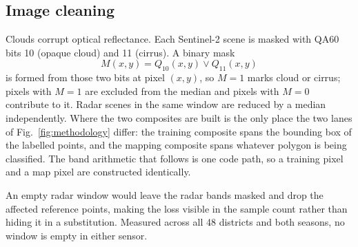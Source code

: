 \documentclass[conference]{IEEEtran}
\begin{document}
\subsection{Image cleaning}
Clouds corrupt optical reflectance. Each Sentinel-2 scene is masked with QA60 bits 10 (opaque cloud) and 11 (cirrus). A binary mask
\begin{equation}
M(x,y) = Q_{10}(x,y) \lor Q_{11}(x,y)
\end{equation}
is formed from those two bits at pixel $(x, y)$, so $M=1$ marks cloud or cirrus; pixels with $M=1$ are excluded from the median and pixels with $M=0$ contribute to it. Radar scenes in the same window are reduced by a median independently. Where the two composites are built is the only place the two lanes of Fig.~\ref{fig:methodology} differ: the training composite spans the bounding box of the labelled points, and the mapping composite spans whatever polygon is being classified. The band arithmetic that follows is one code path, so a training pixel and a map pixel are constructed identically.

An empty radar window would leave the radar bands masked and drop the affected reference points, making the loss visible in the sample count rather than hiding it in a substitution. Measured across all 48 districts and both seasons, no window is empty in either sensor.
\end{document}
